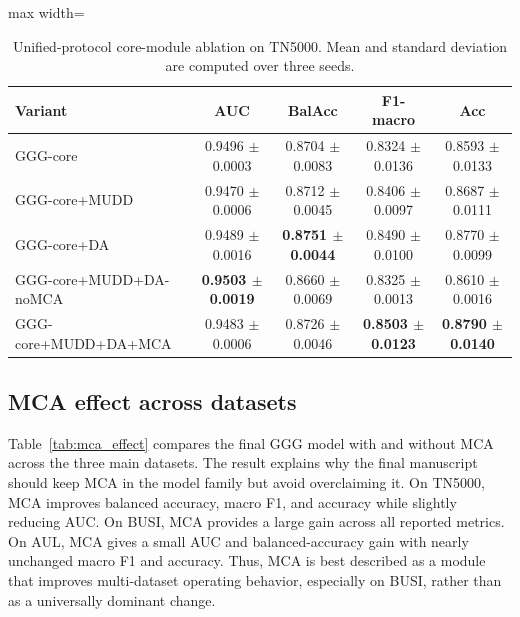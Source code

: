 \begin{table}[t]
    \centering
    \small
    \caption{Unified-protocol core-module ablation on TN5000. Mean and standard deviation are computed over three seeds.}
    \label{tab:tn5000_module_ablation}
    \begin{adjustbox}{max width=\columnwidth}
    \begin{tabular}{lcccc}
        \toprule
        Variant & AUC & BalAcc & F1-macro & Acc \\
        \midrule
        GGG-core & 0.9496 $\pm$ 0.0003 & 0.8704 $\pm$ 0.0083 & 0.8324 $\pm$ 0.0136 & 0.8593 $\pm$ 0.0133 \\
        GGG-core+MUDD & 0.9470 $\pm$ 0.0006 & 0.8712 $\pm$ 0.0045 & 0.8406 $\pm$ 0.0097 & 0.8687 $\pm$ 0.0111 \\
        GGG-core+DA & 0.9489 $\pm$ 0.0016 & \textbf{0.8751 $\pm$ 0.0044} & 0.8490 $\pm$ 0.0100 & 0.8770 $\pm$ 0.0099 \\
        GGG-core+MUDD+DA-noMCA & \textbf{0.9503 $\pm$ 0.0019} & 0.8660 $\pm$ 0.0069 & 0.8325 $\pm$ 0.0013 & 0.8610 $\pm$ 0.0016 \\
        GGG-core+MUDD+DA+MCA & 0.9483 $\pm$ 0.0006 & 0.8726 $\pm$ 0.0046 & \textbf{0.8503 $\pm$ 0.0123} & \textbf{0.8790 $\pm$ 0.0140} \\
        \bottomrule
    \end{tabular}
    \end{adjustbox}
\end{table}

\subsection{MCA effect across datasets}
Table~\ref{tab:mca_effect} compares the final GGG model with and without MCA across the three main datasets. The result explains why the final manuscript should keep MCA in the model family but avoid overclaiming it. On TN5000, MCA improves balanced accuracy, macro F1, and accuracy while slightly reducing AUC. On BUSI, MCA provides a large gain across all reported metrics. On AUL, MCA gives a small AUC and balanced-accuracy gain with nearly unchanged macro F1 and accuracy. Thus, MCA is best described as a module that improves multi-dataset operating behavior, especially on BUSI, rather than as a universally dominant change.

